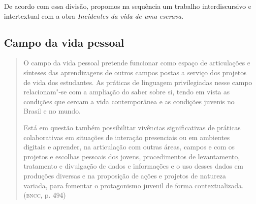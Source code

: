 \documentclass[11pt]{extarticle}
\begin{document}
De acordo com essa divisão, propomos na sequência um trabalho
interdiscursivo e intertextual com a obra \emph{Incidentes da vida de uma escrava.}

\subsection{Campo da vida pessoal}

\begin{quote}
O campo da vida pessoal pretende funcionar como espaço de articulações
e sínteses das aprendizagens de outros campos postas a serviço dos
projetos de vida dos estudantes. As práticas de linguagem privilegiadas
nesse campo relacionam"-se com a ampliação do saber sobre si, tendo em
vista as condições que cercam a vida contemporânea e as condições
juvenis no Brasil e no mundo.

Está em questão também possibilitar vivências significativas de práticas
colaborativas em situações de interação presenciais ou em ambientes
digitais e aprender, na articulação com outras áreas, campos e com os
projetos e escolhas pessoais dos jovens, procedimentos de levantamento,
tratamento e divulgação de dados e informações e o uso desses dados em
produções diversas e na proposição de ações e projetos de natureza
variada, para fomentar o protagonismo juvenil de forma
contextualizada. (\textsc{bncc}, p. 494)
\end{quote}
\end{document}
